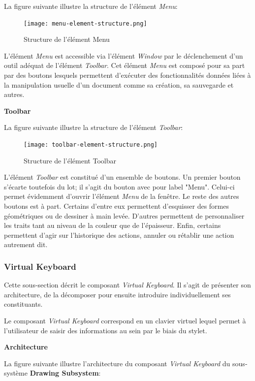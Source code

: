 \documentclass[11pt,a4paper,oldfontcommands]{memoir}
\begin{document}
La figure suivante illustre la structure de l'élément \textit{Menu}:

\begin{figure}[H]
\centering
\texttt{[image: menu-element-structure.png]}
\caption{Structure de l'élément Menu}
\end{figure}

L'élément \textit{Menu} est accessible via l'élément \textit{Window} par le déclenchement d'un outil adéquat de l'élément \textit{Toolbar}. Cet élément \textit{Menu} est composé pour sa part par des boutons lesquels permettent d'exécuter des fonctionnalités données liées à la manipulation usuelle d'un document comme sa création, sa sauvegarde et autres.

\textbf{Toolbar}

La figure suivante illustre la structure de l'élément \textit{Toolbar}:

\begin{figure}[H]
\centering
\texttt{[image: toolbar-element-structure.png]}
\caption{Structure de l'élément Toolbar}
\end{figure}

L'élément \textit{Toolbar} est constitué d'un ensemble de boutons. Un premier bouton s'écarte toutefois du lot; il s'agit du bouton avec pour label "Menu". Celui-ci permet évidemment d'ouvrir l'élément \textit{Menu} de la fenêtre. Le reste des autres boutons est à part. Certains d'entre eux permettent d'esquisser des formes géométriques ou de dessiner à main levée. D'autres permettent de personnaliser les traits tant au niveau de la couleur que de l'épaisseur. Enfin, certains permettent d'agir sur l'historique des actions, annuler ou rétablir une action autrement dit.

\subsubsection{Virtual Keyboard}

Cette sous-section décrit le composant \textit{Virtual Keyboard}. Il s'agit de présenter son architecture, de la décomposer pour ensuite introduire individuellement ses constituants.

Le composant \textit{Virtual Keyboard} correspond en un clavier virtuel lequel permet à l'utilisateur de saisir des informations au sein par le biais du stylet.

\textbf{Architecture}

La figure suivante illustre l'architecture du composant \textit{Virtual Keyboard} du sous-système \textbf{Drawing Subsystem}:
\end{document}
